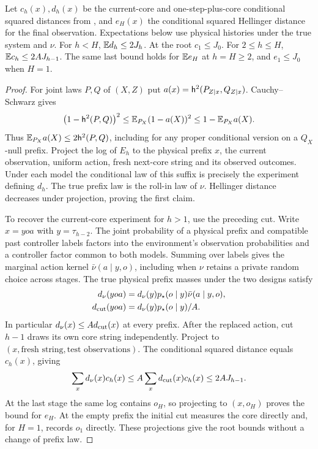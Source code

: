 \begin{lemma}\label{lem:cutprojection}
Let $c_h(x),d_h(x)$ be the current-core and one-step-plus-core conditional squared distances from , and $e_H(x)$ the conditional squared Hellinger distance for the final observation. Expectations below use physical histories under the true system and $\nu$. For $h<H$, $\mathbb E d_h\le2J_h$. At the root $c_1\le J_0$. For $2\le h\le H$, $\mathbb E c_h\le2A J_{h-1}$. The same last bound holds for $\mathbb E e_H$ at $h=H\ge2$, and $e_1\le J_0$ when $H=1$.
\end{lemma}
\begin{proof}
For joint laws $P,Q$ of $(X,Z)$ put $a(x)=\mathsf h^2(P_{Z\mid x},Q_{Z\mid x})$. Cauchy--Schwarz gives
\[
 \big(1-\mathsf h^2(P,Q)\big)^2
 \le \mathbb E_{P_X}(1-a(X))^2 \le 1-\mathbb E_{P_X}a(X).
\]
Thus $\mathbb E_{P_X}a(X)\le2\mathsf h^2(P,Q)$, including for any proper conditional version on a $Q_X$-null prefix. Project the log of $E_h$ to the physical prefix $x$, the current observation, uniform action, fresh next-core string and its observed outcomes. Under each model the conditional law of this suffix is precisely the experiment defining $d_h$. The true prefix law is the roll-in law of $\nu$. Hellinger distance decreases under projection, proving the first claim.

To recover the current-core experiment for $h>1$, use the preceding cut. Write $x=yoa$ with $y=\tau_{h-2}$. The joint probability of a physical prefix and compatible past controller labels factors into the environment's observation probabilities and a controller factor common to both models. Summing over labels gives the marginal action kernel $\bar\nu(a\mid y,o)$, including when $\nu$ retains a private random choice across stages. The true physical prefix masses under the two designs satisfy
\begin{align*}
 d_\nu(yoa)&=d_\nu(y)p_\star(o\mid y)\bar\nu(a\mid y,o),\\
 d_{\rm cut}(yoa)&=d_\nu(y)p_\star(o\mid y)/A .
\end{align*}
In particular $d_\nu(x)\le A d_{\rm cut}(x)$ at every prefix. After the replaced action, cut $h-1$ draws its own core string independently. Project to $(x,\text{fresh string},\text{test observations})$. The conditional squared distance equals $c_h(x)$, giving
\[
 \sum_x d_\nu(x)c_h(x)
 \le A\sum_x d_{\rm cut}(x)c_h(x)\le2A J_{h-1}.
\]
At the last stage the same log contains $o_H$, so projecting to $(x,o_H)$ proves the bound for $e_H$. At the empty prefix the initial cut measures the core directly and, for $H=1$, records $o_1$ directly. These projections give the root bounds without a change of prefix law.
\end{proof}

